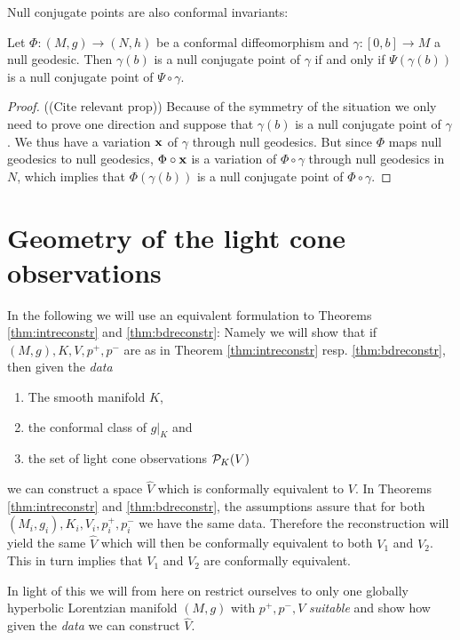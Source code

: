 Null conjugate points are also conformal invariants:
\begin{proposition}
    Let $\Phi:(M,g)\to (N,h)$ be a conformal diffeomorphism and $\gamma:[0,b]\to M$ a null geodesic. Then $\gamma(b)$ is a null conjugate point of $\gamma$ if and only if $\Psi(\gamma(b))$ is a null conjugate point of $\Psi \circ \gamma$.
\end{proposition}
\begin{proof}
    ((Cite relevant prop))
    Because of the symmetry of the situation we only need to prove one direction and suppose that $\gamma(b)$ is a null conjugate point of $\gamma$. We thus have a variation $\mathbf{x}$ of $\gamma$ through null geodesics. But since $\Phi$ maps null geodesics to null geodesics, $\Phi\circ \mathbf{x}$ is a variation of $\Phi \circ \gamma$ through null geodesics in $N$, which implies that $\Phi(\gamma(b))$ is a null conjugate point of $\Phi \circ \gamma$.
\end{proof}

\section{Geometry of the light cone observations}

\begin{remark}[Data]\label{rmk:data} 
    In the following we will use an equivalent formulation to Theorems \ref{thm:intreconstr} and \ref{thm:bdreconstr}: Namely we will show that if $(M,g), K, V, p^+,p^-$ are as in Theorem \ref{thm:intreconstr} resp. \ref{thm:bdreconstr}, then given the \emph{data}
    \begin{enumerate}[label={\textnormal{(\arabic*)}}]
        \item The smooth manifold $K$,
        \item the conformal class of $g\rvert_K$ and
        \item the set of light cone observations ${\mathcal{P}}_K(V)$
    \end{enumerate}
    we can construct a space $\widehat{V}$ which is conformally equivalent to $V$.
    In Theorems \ref{thm:intreconstr} and \ref{thm:bdreconstr}, the assumptions assure that for both $(M_i,g_i), K_i, V_i, p^+_i,p^-_i$ we have the same data. Therefore the reconstruction will yield the same $\widehat{V}$ which will then be conformally equivalent to both $V_1$ and $V_2$. This in turn implies that $V_1$ and $V_2$ are conformally equivalent.

    In light of this we will from here on restrict ourselves to only one globally hyperbolic Lorentzian manifold $(M,g)$ with $p^+,p^-, V$ \emph{suitable} and show how given the \emph{data} we can construct $\widehat{V}$.
\end{remark}

